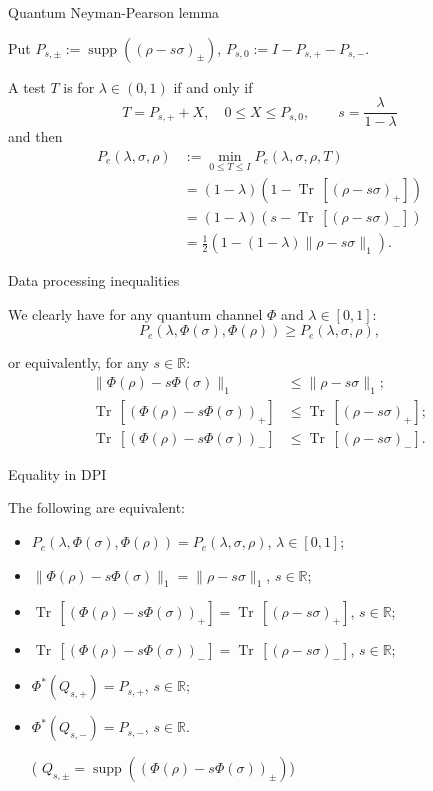 \documentclass[mathserif]{beamer}
\newcommand{\<}{\langle}
\renewcommand{\>}{\rangle}
\newcommand{\supp}{\operatorname{supp}}
\newcommand{\Tr}{\operatorname{Tr}\,}
\begin{document}
\begin{frame}{Quantum Neyman-Pearson lemma}


 Put $P_{s,\pm}:=\supp((\rho-s\sigma)_\pm)$, $P_{s,0}:=I-P_{s,+}-P_{s,-}$.


\bigskip
 A test $T$ is  for $\lambda\in (0,1)$ if and only if
\[
T=P_{s,+}+X,\quad 0\le X\le P_{s,0},\qquad s=\frac{\lambda}{1-\lambda}
\]
and then
\begin{align*}
P_e(\lambda,\sigma,\rho)&:=\min_{0\le T\le I} P_e(\lambda,\sigma,\rho,T)\\
&=(1-\lambda)(1-\Tr[(\rho-s\sigma)_+])\\
&=(1-\lambda)(s-\Tr[(\rho-s\sigma)_-])\\
&=\frac12(1-(1-\lambda)\|\rho-s\sigma\|_1).
\end{align*}



\end{frame}


\begin{frame}{Data processing inequalities}

 We clearly have  for any quantum channel $\Phi$ and $\lambda\in [0,1]$:
\[
P_e(\lambda,\Phi(\sigma),\Phi(\rho))\ge P_e(\lambda,\sigma,\rho),
\]
\medskip

or equivalently, for any $s\in \mathbb R$:
\begin{align*}
\|\Phi(\rho)-s\Phi(\sigma)\|_1&\le \|\rho-s\sigma\|_1;\\[0.3em]
\Tr[(\Phi(\rho)-s\Phi(\sigma))_+]&\le \Tr[(\rho-s\sigma)_+];\\[0.3em]
\Tr[(\Phi(\rho)-s\Phi(\sigma))_-]&\le \Tr[(\rho-s\sigma)_-].
\end{align*}




\end{frame}


\begin{frame}{Equality in DPI}

The following are equivalent:

\bigskip

\begin{itemize}
\item $P_e(\lambda,\Phi(\sigma),\Phi(\rho))= P_e(\lambda,\sigma,\rho)$, $\lambda\in [0,1]$;
\item $\|\Phi(\rho)-s\Phi(\sigma)\|_1=\|\rho-s\sigma\|_1$, $s\in \mathbb R$;
\item $\Tr[(\Phi(\rho)-s\Phi(\sigma))_+]= \Tr[(\rho-s\sigma)_+]$, $s\in \mathbb R$;
\item $\Tr[(\Phi(\rho)-s\Phi(\sigma))_-]= \Tr[(\rho-s\sigma)_-]$, $s\in \mathbb R$;
\item $\Phi^*(Q_{s,+})=P_{s,+}$, $s\in \mathbb R$;
\item $\Phi^*(Q_{s,-})=P_{s,-}$, $s\in \mathbb R$.


\medskip

\hskip 2cm ( $Q_{s,\pm}=\supp((\Phi(\rho)-s\Phi(\sigma))_\pm)$)

\end{itemize}
\bigskip
{}

\end{frame}
\end{document}
